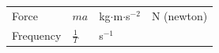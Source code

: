 {{\begin{center}
\begin{xtabular}[t]{|l|l|l|l|}
        Force &
    
    
        
                \begin{math}ma\end{math}
               &
    
    
        kg\begin{math}\ensuremath{\cdot}\end{math}m\begin{math}\ensuremath{\cdot}\end{math}s\begin{math}{}^{-2}\end{math} &
    
    
        N (newton)%
     \tabularnewline{}
    
    
        Frequency &
    
    
        
                \begin{math}\frac{1}{T}\end{math}
               &
    
    
        s\begin{math}{}^{-1}\end{math} &
    

\end{xtabular}
\end{center}}}
